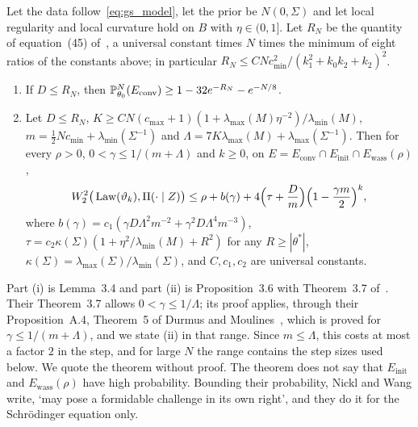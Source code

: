 \begin{theorem}\label{thm:gs_main}
Let the data follow~\eqref{eq:gs_model}, let the prior be $N(0,\Sigma)$ and let local regularity and local curvature hold on $B$ with $\eta\in(0,1]$. Let $R_N$ be the quantity of equation~(45) of~\cite{nicklwang2024}, a universal constant times $N$ times the minimum of eight ratios of the constants above; in particular $R_N\le CNc_{\min}^2/(k_1^2+k_0k_2+k_2)^2$.
\begin{enumerate}[label=(\roman*),nosep]
\item If $D\le R_N$, then $\P_{\theta_0}^N(E_{\mathrm{conv}})\ge1-32e^{-R_N}-e^{-N/8}$.
\item Let $D\le R_N$, $K\ge CN(c_{\max}+1)(1+\lambda_{\max}(M)\eta^{-2})/\lambda_{\min}(M)$, $m=\frac12Nc_{\min}+\lambda_{\min}(\Sigma^{-1})$ and $\Lambda=7K\lambda_{\max}(M)+\lambda_{\max}(\Sigma^{-1})$. Then for every $\rho>0$, $0<\gamma\le1/(m+\Lambda)$ and $k\ge0$, on $E=E_{\mathrm{conv}}\cap E_{\mathrm{init}}\cap E_{\mathrm{wass}}(\rho)$,
\begin{equation}\label{eq:gs_w2}
W_2^2\big(\Law(\vartheta_k),\Pi(\cdot\mid Z)\big)\le\rho+b(\gamma)+4\Big(\tau+\frac Dm\Big)\Big(1-\frac{\gamma m}2\Big)^k,
\end{equation}
where $b(\gamma)=c_1(\gamma D\Lambda^2m^{-2}+\gamma^2D\Lambda^4m^{-3})$, $\tau=c_2\kappa(\Sigma)(1+\eta^2/\lambda_{\min}(M)+R^2)$ for any $R\ge|\theta^*|$, $\kappa(\Sigma)=\lambda_{\max}(\Sigma)/\lambda_{\min}(\Sigma)$, and $C,c_1,c_2$ are universal constants.
\end{enumerate}
\end{theorem}

Part (i) is Lemma~3.4 and part (ii) is Proposition~3.6 with Theorem~3.7 of~\cite{nicklwang2024}. Their Theorem~3.7 allows $0<\gamma\le1/\Lambda$; its proof applies, through their Proposition~A.4, Theorem~5 of Durmus and Moulines~\cite{durmusmoulines2019}, which is proved for $\gamma\le1/(m+\Lambda)$, and we state (ii) in that range. Since $m\le\Lambda$, this costs at most a factor $2$ in the step, and for large $N$ the range contains the step sizes used below. We quote the theorem without proof. The theorem does not say that $E_{\mathrm{init}}$ and $E_{\mathrm{wass}}(\rho)$ have high probability. Bounding their probability, Nickl and Wang write, `may pose a formidable challenge in its own right', and they do it for the Schr\"odinger equation only.

